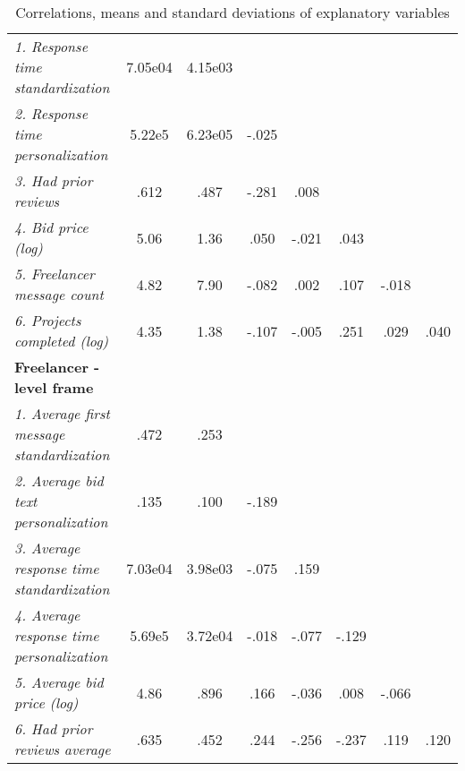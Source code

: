 \begin{table}[h!]
{\begin{tabular}{lccccccc}
\textit{1. Response time standardization} 
& 7.05e04 & 4.15e03 & & & & &                      \\
\textit{2. Response time personalization} 
& {5.22}e5 & 6.23e05 & -.025 & & & &                      \\
\textit{3. Had prior reviews} 
& .612 & .487 & -.281 & .008 & & &                      \\
\textit{4. Bid price (log)}                        
& 5.06 & 1.36 & .050 & -.021 & 
.043 & &                     \\
\textit{5. Freelancer message count}      & 4.82 & 7.90 & -.082                     & .002                      & .107                     & -.018               \\
\textit{6. Projects completed (log)}
& {4.35} & {1.38} & {-.107} 
& {-.005} & {.251} & {.029} & {.040}
\\ \hline

\textbf{Freelancer - level {frame}}                  
& \multicolumn{1}{l}{} & \multicolumn{1}{l}{}
& \multicolumn{1}{l}{}       & \multicolumn{1}{l}{}       & \multicolumn{1}{l}{}      & \multicolumn{1}{l}{} \\ \hline
\textit{1. Average first message standardization}  & {.472}                                    & .253                                               &                            &                            &                           &                      \\
\textit{2. Average bid text personalization}       & .13{5}                                   & {.100}                                              & -.{189}                     &                            &                           &                      \\
\textit{3. Average response time standardization}  & 7.03e04
& 3.9{8}e03                   
& -.0{75}
& .1{59}                &                           &                      \\
\textit{4. Average response time personalization}  & {5.69e5}                                     & {3.72e04}
& -.01{8}                     
& -.0{77}                
& -.{129}                    &                      \\
\textit{5. Average bid price (log)}       
& 4.{86}                                     
& .8{96}                                            
& .1{66}                     
& -.0{36}                 
& .00{8}               
& -.0{66} \\
\textit{6. Had prior reviews average}              & .63{5}                                    & .4{52}                                              & .2{44}                      & -.2{56}                     & -.237                    & {.119} & {.120}       
\\ \hline
\end{tabular}
}
\caption{Correlations, means and standard deviations of explanatory variables}

\end{table}
